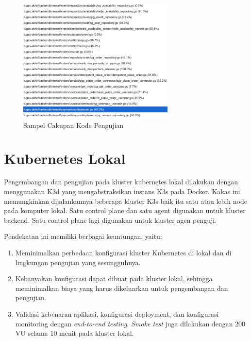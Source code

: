 \begin{figure}[htbp]
    \centering
    \includegraphics[width=0.7\textwidth]{resources/appendix/coverage.png}
    \caption{Sampel Cakupan Kode Pengujian}
    \label{fig:code-coverage}
\end{figure}

\pagebreak

\section{Kubernetes Lokal}

Pengembangan dan pengujian pada kluster kubernetes lokal dilakukan dengan menggunakan K3d yang mengabstraksikan instans K3s pada Docker. Kakas ini memungkinkan dijalankannya beberapa kluster K3s baik itu satu atau lebih node pada komputer lokal. Satu control plane dan satu agent digunakan untuk kluster backend. Satu control plane lagi digunakan untuk kluster agen penguji.

Pendekatan ini memiliki berbagai keuntungan, yaitu:

\begin{enumerate}
    \item Meminimalkan perbedaan konfigurasi kluster Kubernetes di lokal dan di lingkungan pengujian yang sesungguhnya.
    \item Kebanyakan konfigurasi dapat dibuat pada kluster lokal, sehingga meminimalkan biaya yang harus dikeluarkan untuk pengembangan dan pengujian.
    \item Validasi kebenaran aplikasi, konfigurasi deployment, dan konfigurasi monitoring dengan \textit{end-to-end testing}. \textit{Smoke test} juga dilakukan dengan 200 VU selama 10 menit pada kluster lokal.
\end{enumerate}
